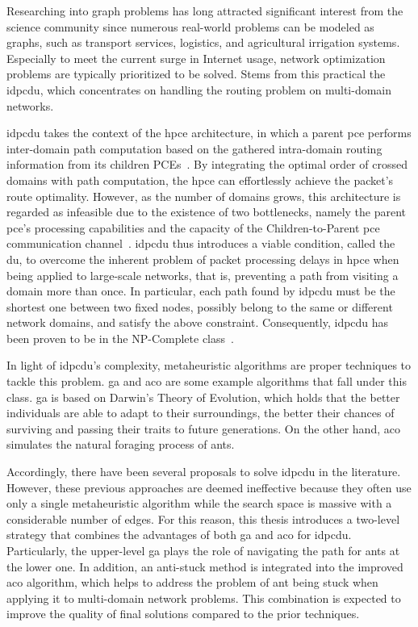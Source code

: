 Researching into graph problems has long attracted significant interest from the science community since numerous real-world problems can be modeled as graphs, such as transport services, logistics, and agricultural irrigation systems. Especially to meet the current surge in Internet usage, network optimization problems are typically prioritized to be solved. Stems from this practical the \gls{idpcdu}, which concentrates on handling the routing problem on multi-domain networks. 

\gls{idpcdu} takes the context of the \gls{hpce} architecture, in which a parent \gls{pce} performs inter-domain path computation based on the gathered intra-domain routing information from its children PCEs~\cite{paolucci2013survey}. By integrating the optimal order of crossed domains with path computation, the \gls{hpce} can effortlessly achieve the packet's route optimality. However, as the number of domains grows, this architecture is regarded as infeasible due to the existence of two bottlenecks, namely the parent \gls{pce}'s processing capabilities and the capacity of the Children-to-Parent \gls{pce} communication channel~\cite{king2012application}. \gls{idpcdu} thus introduces a viable condition, called the \gls{du}, to overcome the inherent problem of packet processing delays in \gls{hpce} when being applied to large-scale networks, that is, preventing a path from visiting a domain more than once. In particular, each path found by \gls{idpcdu} must be the shortest one between two fixed nodes, possibly belong to the same or different network domains, and satisfy the above constraint. Consequently, \gls{idpcdu} has been proven to be in the NP-Complete class~\cite{maggi2018domain}. 

In light of \gls{idpcdu}'s complexity, metaheuristic algorithms are proper techniques to tackle this problem. \gls{ga} and \gls{aco} are some example algorithms that fall under this class. \gls{ga} is based on Darwin's Theory of Evolution, which holds that the better individuals are able to adapt to their surroundings, the better their chances of surviving and passing their traits to future generations. On the other hand, \gls{aco} simulates the natural foraging process of ants.

Accordingly, there have been several proposals to solve \gls{idpcdu} in the literature. However, these previous approaches are deemed ineffective because they often use only a single metaheuristic algorithm while the search space is massive with a considerable number of edges. For this reason, this thesis introduces a two-level strategy that combines the advantages of both \gls{ga} and \gls{aco} for \gls{idpcdu}. Particularly, the upper-level \gls{ga} plays the role of navigating the path for ants at the lower one. In addition, an anti-stuck method is integrated into the improved \gls{aco} algorithm, which helps to address the problem of ant being stuck when applying it to multi-domain network problems. This combination is expected to improve the quality of final solutions compared to the prior techniques.

